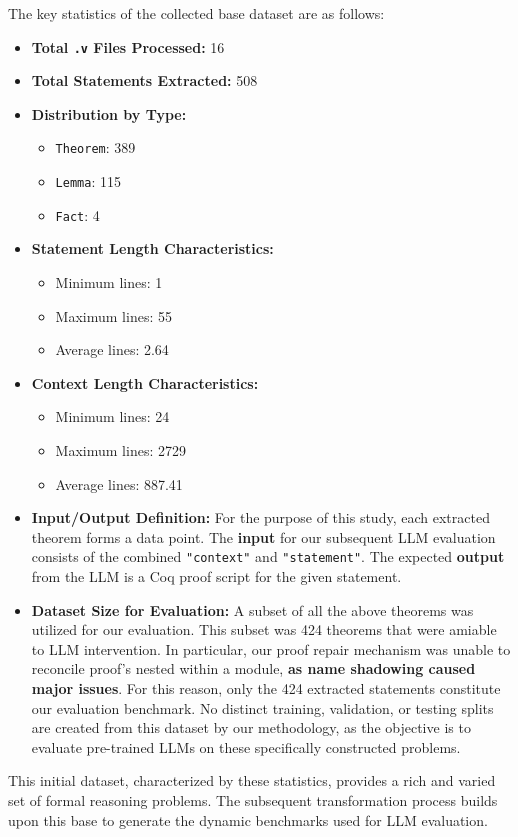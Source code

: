 The key statistics of the collected base dataset are as follows:
\begin{itemize}
    \item \textbf{Total \texttt{.v} Files Processed:} 16
    \item \textbf{Total Statements Extracted:} 508
    \item \textbf{Distribution by Type:}
    \begin{itemize}
        \item \texttt{Theorem}: 389
        \item \texttt{Lemma}: 115
        \item \texttt{Fact}: 4
    \end{itemize}
    \item \textbf{Statement Length Characteristics:}
    \begin{itemize}
        \item Minimum lines: 1
        \item Maximum lines: 55
        \item Average lines: 2.64
    \end{itemize}
    \item \textbf{Context Length Characteristics:}
    \begin{itemize}
        \item Minimum lines: 24
        \item Maximum lines: 2729
        \item Average lines: 887.41
    \end{itemize}
    \item \textbf{Input/Output Definition:} For the purpose of this study, each extracted theorem forms a data point. The \textbf{input} for our subsequent LLM evaluation consists of the combined \texttt{"context"} and \texttt{"statement"}. The expected \textbf{output} from the LLM is a Coq proof script for the given statement.
    \item \textbf{Dataset Size for Evaluation:} A subset of all the above theorems was utilized for our evaluation. This subset was 424 theorems that were amiable to LLM intervention. In particular, our proof repair mechanism was unable to reconcile proof's nested within a module, \textbf{as name shadowing caused major issues}. For this reason, only the 424 extracted statements constitute our evaluation benchmark. No distinct training, validation, or testing splits are created from this dataset by our methodology, as the objective is to evaluate pre-trained LLMs on these specifically constructed problems.
\end{itemize}
This initial dataset, characterized by these statistics, provides a rich and varied set of formal reasoning problems. The subsequent transformation process builds upon this base to generate the dynamic benchmarks used for LLM evaluation.